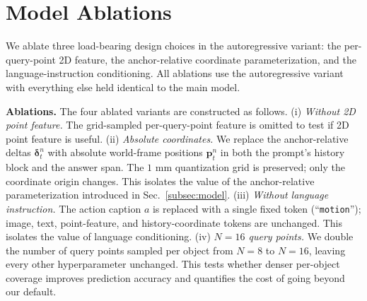 \documentclass{llmxive}
\begin{document}
\section{Model Ablations}
\label{appsec:ablations}

We ablate three load-bearing design choices in the autoregressive
variant: the per-query-point 2D feature, the anchor-relative coordinate
parameterization, and the language-instruction conditioning.
All ablations use the autoregressive variant with everything else held
identical to the main model.

\noindent\textbf{Ablations.}
The four ablated variants are constructed as follows.
(i) \textit{Without 2D point feature.} The grid-sampled per-query-point feature
is omitted to test if 2D point feature is useful.
(ii) \textit{Absolute coordinates.} We replace the anchor-relative deltas
$\boldsymbol{\delta}_t^n$ with absolute world-frame positions $\mathbf{p}_t^n$
in both the prompt's history block and the answer span. The $1$ mm
quantization grid is preserved; only the coordinate origin changes. This
isolates the value of the anchor-relative parameterization introduced in
Sec.~\ref{subsec:model}.
(iii) \textit{Without language instruction.} The action caption $a$ is
replaced with a single fixed token (``\texttt{motion}''); image, text,
point-feature, and history-coordinate tokens are unchanged. This isolates the
value of language conditioning.
(iv) \textit{$N=16$ query points.} We double the number of query points sampled
per object from $N=8$ to $N=16$, leaving every other hyperparameter unchanged.
This tests whether denser per-object coverage improves prediction accuracy and
quantifies the cost of going beyond our default.
\end{document}
